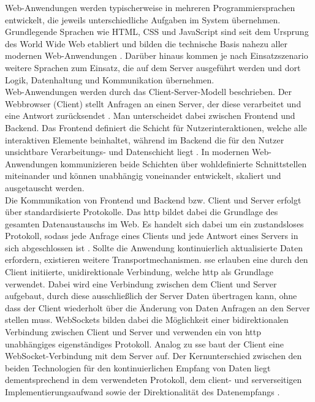 Web-Anwendungen werden typischerweise in mehreren Programmiersprachen entwickelt, die jeweils unterschiedliche Aufgaben im System übernehmen.
Grundlegende Sprachen wie HTML, CSS und JavaScript sind seit dem Ursprung des World Wide Web etabliert und bilden die technische Basis nahezu aller modernen Web-Anwendungen \cite{mdn_client_server}.
Darüber hinaus kommen je nach Einsatzszenario weitere Sprachen zum Einsatz, die auf dem Server ausgeführt werden und dort Logik, Datenhaltung und Kommunikation übernehmen. \\

Web-Anwendungen werden durch das Client-Server-Modell beschrieben. Der Webbrowser (Client) stellt Anfragen an einen Server,
der diese verarbeitet und eine Antwort zurücksendet \cite{gfg_client_server}. 
Man unterscheidet dabei zwischen Frontend und Backend. Das Frontend definiert die Schicht für Nutzerinteraktionen, welche alle interaktiven Elemente beinhaltet,
während im Backend die für den Nutzer unsichtbare Verarbeitungs- und Datenschicht liegt \cite{aws_frontend_backend}.
In modernen Web-Anwendungen kommunizieren beide Schichten über wohldefinierte Schnittstellen miteinander und können unabhängig voneinander entwickelt, skaliert und ausgetauscht werden. \\

Die Kommunikation von Frontend und Backend bzw. Client und Server erfolgt über standardisierte Protokolle. Das \gls{http} bildet dabei die Grundlage des gesamten Datenaustauschs im Web.
Es handelt sich dabei um ein zustandsloses Protokoll, sodass jede Anfrage eines Clients und jede Antwort eines Servers in sich abgeschlossen ist \cite{mdn_http_overview}.
Sollte die Anwendung kontinuierlich aktualisierte Daten erfordern, existieren weitere Transportmechanismen.
\gls{sse} erlauben eine durch den Client initiierte, unidirektionale Verbindung, welche \gls{http} als Grundlage verwendet.
Dabei wird eine Verbindung zwischen dem Client und Server aufgebaut, durch diese ausschließlich der Server Daten übertragen kann,
ohne dass der Client wiederholt über die Änderung von Daten Anfragen an den Server stellen muss.
WebSockets bilden dabei die Möglichkeit einer bidirektionalen Verbindung zwischen Client und Server und verwenden ein von \gls{http} unabhängiges eigenständiges Protokoll.
Analog zu \gls{sse} baut der Client eine WebSocket-Verbindung mit dem Server auf. Der Kernunterschied zwischen den beiden Technologien für den kontinuierlichen Empfang 
von Daten liegt dementsprechend in dem verwendeten Protokoll, dem client- und serverseitigen Implementierungsaufwand sowie der Direktionalität des Datenempfangs \cite{softwaremill_sse_ws}.


